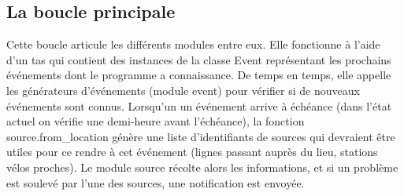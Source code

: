 \documentclass[a4paper, 12pt]{article}
\begin{document}
\subsection{La boucle principale}

Cette boucle articule les différents modules entre eux.
Elle fonctionne à l'aide d'un tas qui contient des instances de la classe Event
représentant les prochains événements dont le programme a connaissance.
De temps en temps, elle appelle les générateurs d'événements (module event) pour
vérifier si de nouveaux événements sont connus.
Lorsqu'un un événement arrive à échéance (dans l'état actuel on vérifie une
demi-heure avant l'échéance), la fonction source.from\_location génère une liste
d'identifiants de sources qui devraient être utiles pour ce rendre à cet
événement (lignes passant auprès du lieu, stations vélos proches). %
Le module source récolte alors les informations, et si un problème est soulevé
par l'une des sources, une notification est envoyée.
\end{document}
